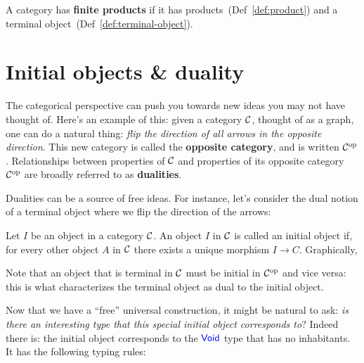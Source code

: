 \begin{definition} \label{def:finite-products}
  A category has \textbf{finite products}
  if it has products~(Def~\ref{def:product}) and a terminal object~(Def~\ref{def:terminal-object}).
\end{definition}

\section{Initial objects \& duality}
The categorical perspective can push you towards new ideas you may not have
thought of. Here's an example of this: given a category $\mathcal C$, thought of as a
graph, one can do a natural thing: \emph{flip the direction of all arrows in the
opposite direction}. This new category is called the \textbf{opposite category},
and is written $\mathcal C^\text{op}$.
Relationships between properties of $\mathcal C$ and properties of its opposite 
category $\mathcal C^\text{op}$ are broadly referred to as \textbf{dualities}.

Dualities can be a source of free ideas. For instance, let's consider the
dual notion of a terminal object where we flip the direction of the arrows:

\begin{definition} 
  \sloppy
  Let $I$ be an object in a category $\mathcal C$. 
  An object $I$ in $\mathcal C$ is called an initial object
  if, for every other object $A$ in $\mathcal C$ there exists a unique 
  morphism $I \xrightarrow{} C$. Graphically,

  \begin{center}
\end{center}
\end{definition}

Note that an object that is terminal in $\mathcal C$ must be initial 
in $\mathcal C^\text{op}$ and vice versa: this is what characterizes 
the terminal object as dual to the initial object. 

Now that we have a ``free'' universal construction, it might be 
natural to ask: \emph{is there an interesting type that this 
special initial object corresponds to}? Indeed there is: the 
initial object corresponds to the $\mathsf{{\color{blue}Void}}$ type that 
has no inhabitants. It has the following typing rules:

